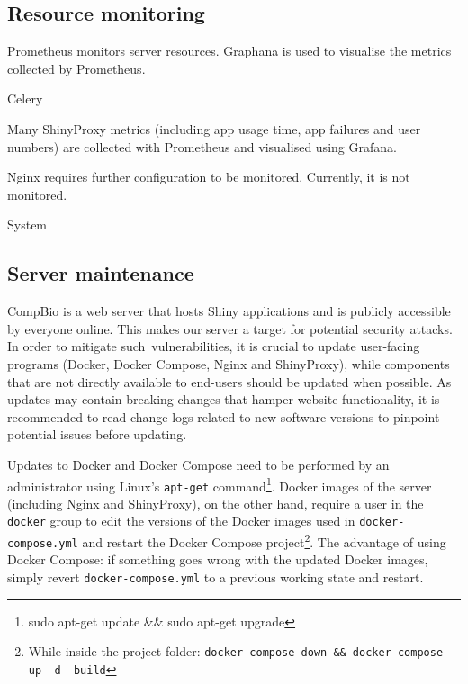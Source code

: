 \subsection{Resource monitoring}

Prometheus monitors server resources. Graphana is used to visualise the metrics collected by Prometheus.

Celery %

Many ShinyProxy metrics (including app usage time, app failures and user numbers) are collected with Prometheus and visualised using Grafana.

Nginx requires further configuration to be monitored. Currently, it is not monitored. %

System %

\subsection{Server maintenance}


CompBio is a web server that hosts Shiny applications and is publicly accessible by everyone online. This makes our server a target for potential security attacks. In order to mitigate such vulnerabilities, it is crucial to update user-facing programs (Docker, Docker Compose, Nginx and ShinyProxy), while components that are not directly available to end-users should be updated when possible. As updates may contain breaking changes that hamper website functionality, it is recommended to read change logs related to new software versions to pinpoint potential issues before updating.


Updates to Docker and Docker Compose need to be performed by an administrator using Linux's \texttt{apt-get} command\footnote{sudo apt-get update \&\& sudo apt-get upgrade}. Docker images of the server (including Nginx and ShinyProxy), on the other hand, require a user in the \texttt{docker} group to edit the versions of the Docker images used in \texttt{docker-compose.yml} and restart the Docker Compose project\footnote{While inside the project folder: \texttt{docker-compose down \&\& docker-compose up -d --build}}. The advantage of using Docker Compose: if something goes wrong with the updated Docker images, simply revert \texttt{docker-compose.yml} to a previous working state and restart.

